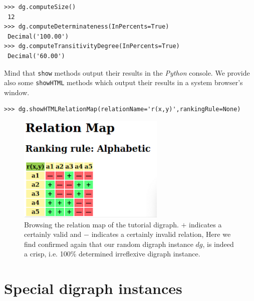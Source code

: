 \begin{lstlisting}[label=list:1.6,basicstyle=\footnotesize]
>>> dg.computeSize()
 12
>>> dg.computeDeterminateness(InPercents=True)
 Decimal('100.00')
>>> dg.computeTransitivityDegree(InPercents=True)
 Decimal('60.00')
\end{lstlisting}
Mind that \texttt{show} methods output their results in the \emph{Python} console. We provide also some \texttt{showHTML} methods which output their results in a system browser’s window.
\begin{lstlisting}[label=list:1.7,basicstyle=\footnotesize]
>>> dg.showHTMLRelationMap(relationName='r(x,y)',rankingRule=None)
\end{lstlisting}
\begin{figure}[h]
\sidecaption
\includegraphics[width=7cm]{Figures/relationMap1.png}
\caption{Browsing the relation map of the tutorial digraph. $+$ indicates a certainly valid and $-$ indicates a certainly  invalid relation, Here we find confirmed again that our random digraph instance $dg$, is indeed a crisp, i.e. 100\% determined irreflexive digraph instance.}
\label{fig:1.2}       %
\end{figure}
\clearpage

\section{Special digraph instances}
\label{sec:1.5}

